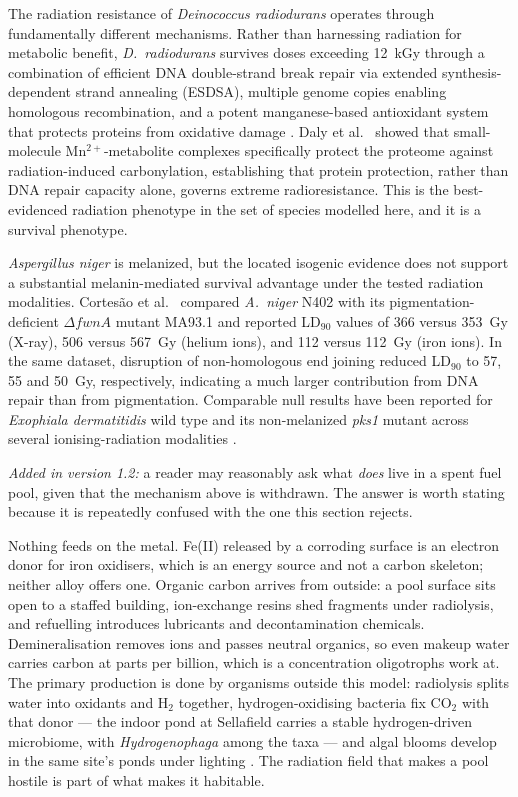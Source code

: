 \documentclass[11pt]{article}
\begin{document}
The radiation resistance of \textit{Deinococcus radiodurans} operates through fundamentally
different mechanisms. Rather than harnessing radiation for metabolic benefit, \textit{D.\
radiodurans} survives doses exceeding 12~kGy through a combination of efficient DNA
double-strand break repair via extended synthesis-dependent strand annealing (ESDSA), multiple
genome copies enabling homologous recombination, and a potent manganese-based antioxidant system
that protects proteins from oxidative damage \cite{slade2011,daly2009}. Daly et al.\
\cite{daly2010} showed that small-molecule Mn$^{2+}$-metabolite complexes specifically protect
the proteome against radiation-induced carbonylation, establishing that protein protection, rather
than DNA repair capacity alone, governs extreme radioresistance. This is the best-evidenced
radiation phenotype in the set of species modelled here, and it is a survival phenotype.

\textit{Aspergillus niger} is melanized, but the located isogenic evidence does not support
a substantial melanin-mediated survival advantage under the tested radiation modalities.
Cortes\~{a}o et al.\ \cite{cortesao2020} compared \textit{A.\ niger} N402 with its
pigmentation-deficient $\Delta fwnA$ mutant MA93.1 and reported LD$_{90}$ values of 366 versus
353~Gy (X-ray), 506 versus 567~Gy (helium ions), and 112 versus 112~Gy (iron ions). In the same
dataset, disruption of non-homologous end joining reduced LD$_{90}$ to 57, 55 and 50~Gy,
respectively, indicating a much larger contribution from DNA repair than from pigmentation.
Comparable null results have been reported for \textit{Exophiala dermatitidis} wild type and its
non-melanized \textit{pks1} mutant across several ionising-radiation modalities \cite{audit2026}.

\emph{Added in version 1.2:} a reader may reasonably ask what \emph{does} live in a spent fuel pool,
given that the mechanism above is withdrawn. The answer is worth stating because it is repeatedly
confused with the one this section rejects.

Nothing feeds on the metal. Fe(II) released by a corroding surface is an electron donor for iron
oxidisers, which is an energy source and not a carbon skeleton; neither alloy offers one. Organic carbon arrives from outside: a pool surface sits
open to a staffed building, ion-exchange resins shed fragments under radiolysis, and refuelling
introduces lubricants and decontamination chemicals. Demineralisation removes ions and passes
neutral organics, so even makeup water carries carbon at parts per billion, which is a concentration
oligotrophs work at. The primary production is done by organisms outside this model: radiolysis
splits water into oxidants and H$_2$ together, hydrogen-oxidising bacteria fix CO$_2$ with that
donor --- the indoor pond at Sellafield carries a stable hydrogen-driven microbiome, with
\textit{Hydrogenophaga} among the taxa \cite{sellafield2020} --- and algal blooms develop in the
same site's ponds under lighting \cite{sellafield2023}. The radiation field that makes a pool
hostile is part of what makes it habitable.
\end{document}
